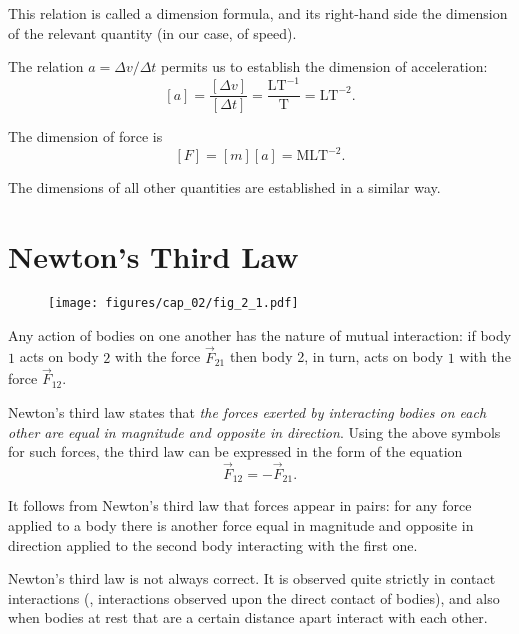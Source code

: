 \noindent
This relation is called a dimension formula, and its right-hand side the dimension of the relevant quantity (in our case, of speed).

The relation $a = \Delta v/\Delta t$ permits us to establish the dimension of acceleration:
\begin{equation}\label{eq:2_15}
[a] = \frac{[\Delta v]}{[\Delta t]} = \frac{\text{LT}^{-1}}{\text{T}} = \text{LT}^{-2}.
\end{equation}

\noindent
The dimension of force is
\begin{equation}\label{eq:2_16}
[F] = [m][a] = \text{MLT}^{-2}.
\end{equation}

\noindent
The dimensions of all other quantities are established in a similar way.

\section{Newton's Third Law}\label{sec:2_6}

\begin{figure}[t]
	\begin{center}
		\texttt{[image: figures/cap\_02/fig\_2\_1.pdf]}
		\caption[]{}
		\label{fig:2_1}
	\end{center}
	\vspace{-0.7cm}
\end{figure}

Any action of bodies on one another has the nature of mutual interaction: if body $1$ acts on body $2$ with the force $\vec{F}_{21}$ then body 2, in turn, acts on body $1$ with the force $\vec{F}_{12}$.

Newton's third law states that \textit{the forces exerted by interacting bodies on each other are equal in magnitude and opposite in direction}. Using the above symbols for such forces, the third law can be expressed in the form of the equation
\begin{equation}\label{eq:2_17}
\vec{F}_{12} = - \vec{F}_{21}.
\end{equation}

It follows from Newton's third law that forces appear in pairs: for any force applied to a body there is another force equal in magnitude and opposite in direction applied to the second body interacting with the first one.

Newton's third law is not always correct. It is observed quite strictly in contact interactions (\ie, interactions observed upon the direct contact of bodies), and also when bodies at rest that are a certain distance apart interact with each other.

